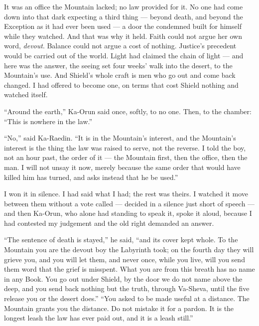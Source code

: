 It was an office the Mountain lacked; no law provided for it. No one had come down into that dark expecting a third thing --- beyond death, and beyond the Exception as it had ever been used --- a door the condemned built for himself while they watched. And that was why it held. Faith could not argue her own word, \emph{devout}. Balance could not argue a cost of nothing. Justice's precedent would be carried out of the world. Light had claimed the chain of light --- and here was the answer, the seeing set four weeks' walk into the desert, to the Mountain's use. And Shield's whole craft is men who go out and come back changed. I had offered to become one, on terms that cost Shield nothing and watched itself.\par

``Around the earth,'' Ka-Orun said once, softly, to no one. Then, to the chamber: ``This is nowhere in the law.''\par

``No,'' said Ka-Raedin. ``It is in the Mountain's interest, and the Mountain's interest is the thing the law was raised to serve, not the reverse. I told the boy, not an hour past, the order of it --- the Mountain first, then the office, then the man. I will not unsay it now, merely because the same order that would have killed him has turned, and asks instead that he be used.''\par

I won it in silence. I had said what I had; the rest was theirs. I watched it move between them without a vote called --- decided in a silence just short of speech --- and then Ka-Orun, who alone had standing to speak it, spoke it aloud, because I had contested my judgement and the old right demanded an answer.\par

``The sentence of death is stayed,'' he said, ``and its cover kept whole. To the Mountain you are the devout boy the Labyrinth took; on the fourth day they will grieve you, and you will let them, and never once, while you live, will you send them word that the grief is misspent. What you are from this breath has no name in any Book. You go out under Shield, by the door we do not name above the deep, and you send back nothing but the truth, through Va-Sheva, until the five release you or the desert does.'' ``You asked to be made useful at a distance. The Mountain grants you the distance. Do not mistake it for a pardon. It is the longest leash the law has ever paid out, and it is a leash still.''\par

